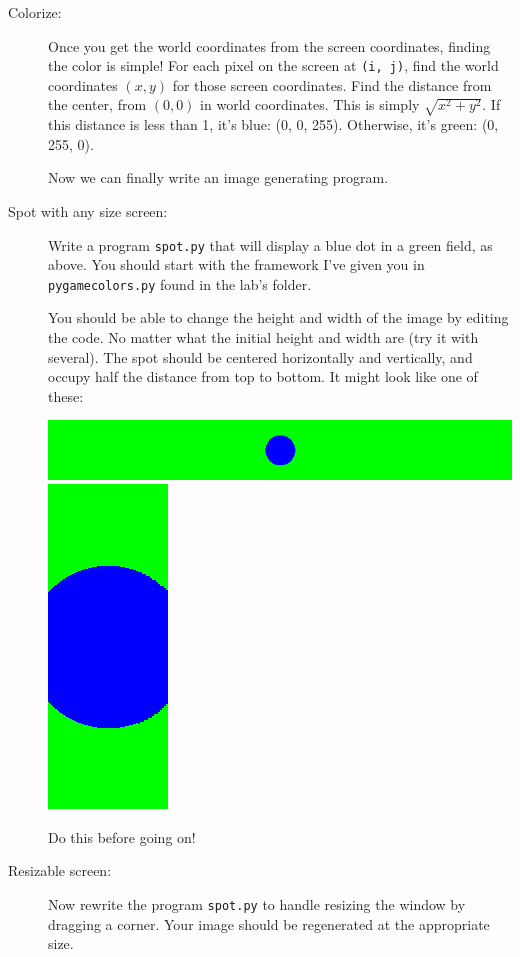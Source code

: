\documentclass[12pt]{article}
\begin{document}
\begin{description}
\item[Colorize:] Once you get the world coordinates from
the screen coordinates, finding the color is simple!
For each pixel on the screen at \lstinline{(i, j)}, find the
world coordinates $(x,y)$ for those screen coordinates.
Find the distance from the center, from $(0,0)$ in world coordinates.
This is simply $\sqrt{x^2 + y^2}$.
If this distance is less than 1, it's blue: (0, 0, 255).  
Otherwise,
it's green: (0, 255, 0).

Now we can finally write an image generating program.

\item[Spot with any size screen:]  
Write a program \lstinline{spot.py}
that will display a blue dot in a green field, as above.
You should start with the framework I've given you in
\lstinline{pygamecolors.py} found in the lab's folder.

You should be able to change the height and width
of the image by editing the code.
No matter what the initial height and width are (try it
with several). The spot should be centered horizontally
and vertically, and occupy half the distance from top to
bottom.  It might look like one of these:

\includegraphics[scale=0.5]{spot02}\hfill
\includegraphics[scale=0.25]{spot03}\hfill ~

Do this before going on!

\item[Resizable screen:]  Now rewrite the program
\lstinline{spot.py} to handle resizing the window by dragging a corner.
Your image should
be regenerated at the appropriate size.


\end{description}
\end{document}
